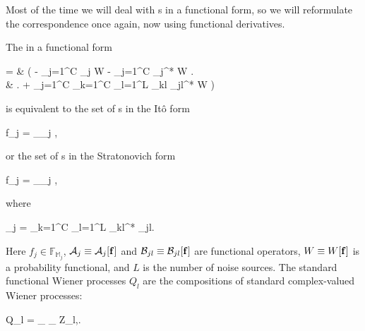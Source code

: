 Most of the time we will deal with s in a functional form, so we will reformulate the correspondence once again, now using functional derivatives.

\begin{theorem}
\label{thm:fpe-sde:corr:fpe-sde-func}
	The  in a functional form
	\begin{eqn*}
		={} & \int \upd\xvec \left(
			- \sum_{j=1}^C  _j W
			- \sum_{j=1}^C  _j^* W \right. \\
		& \left. + \sum_{j=1}^C \sum_{k=1}^C 
				\sum_{l=1}^L \mathcal{B}_{kl} _{jl}^* W
		\right)
	\end{eqn*}
	is equivalent to the set of s in the It\^o form
	\begin{eqn*}
		\upd f_j = _{\restbasis_j} \left[
			\mathcal{A}_j \upd t
			+ \sum_{l=1}^L _{jl} \upd Q_l
		\right],
	\end{eqn*}
	or the set of s in the Stratonovich form
	\begin{eqn*}
		\upd f_j = _{\restbasis_j} \left[
			(\mathcal{A}_j - \mathcal{S}_j) \upd t
			+ \sum_{l=1}^L \mathcal{B}_{jl} \upd Q_l
		\right],
	\end{eqn*}
	where
	\begin{eqn*}
		_j =  \sum_{k=1}^C \sum_{l=1}^L
			\mathcal{B}_{kl}^*
			\frac{\fdelta}{\fdelta f_k^*}
			\mathcal{B}_{jl}.
	\end{eqn*}
	Here $f_j \in \mathbb{F}_{\mathbb{M}_j}$, $\mathcal{A}_j \equiv \mathcal{A}_j[\mathbf{f}]$ and $\mathcal{B}_{jl} \equiv \mathcal{B}_{jl}[\mathbf{f}]$ are functional operators, $W \equiv W[\mathbf{f}]$ is a probability functional, and $L$ is the number of noise sources.
	The standard functional Wiener processes $Q_l$ are the compositions of standard complex-valued Wiener processes:
	\begin{eqn*}
		Q_l = \sum_{\nvec \in \fullbasis} \phi_{\nvec} Z_{l,\nvec}.
	\end{eqn*}
\end{theorem}
